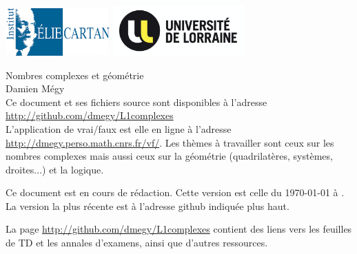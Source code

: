 \documentclass[11pt,a4paper,oneside]{book}
\theoremstyle{definition}
\theoremstyle{plain}
\begin{document}



\begin{titlepage}


\includegraphics[width=4cm]{img/logo-IECL}
\hfill
\includegraphics[width=5cm]{img/logo-UL}\\
\vspace{3em}
\begin{center}
{\Huge Nombres complexes et géométrie}\\
\vspace{3em}
{Damien Mégy\\
\vspace{3em}
{\small \faGithub{}  Ce document et ses fichiers source sont disponibles à l'adresse\\
\url{http://github.com/dmegy/L1complexes}\\
L'application de vrai/faux est elle en ligne à l'adresse \url{http://dmegy.perso.math.cnrs.fr/vf/}. Les thèmes à travailler sont ceux sur les nombres complexes mais aussi ceux sur la géométrie (quadrilatères, systèmes, droites...) et la logique.}
}

\vspace{3em}
Ce document est en cours de rédaction. Cette version est celle du \today{} à \currenttime{}. La version la plus récente est à l'adresse github indiquée plus haut.\\
\begin{mdframed}
La page \url{http://github.com/dmegy/L1complexes} contient des liens vers les feuilles de TD et les annales d'examens, ainsi que d'autres ressources.
\end{mdframed}
\vspace{3em}
\end{center}
\end{titlepage}
\end{document}
